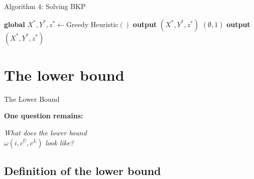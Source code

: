 \documentclass[fleqn,11pt,aspectratio=43]{beamer}
\begin{document}

\begin{frame}[fragile]{Algorithm 4: Solving BKP}
\begin{algorithm}[H]
\caption{Solves BKP}
\begin{algorithmic}[1]
    \State \textbf{global} $X^*, Y^*, z^* \gets \text{Greedy Heuristic}()$
        \State \textbf{output} $(X^*, Y^*, z^*)$
    \EndIf
    \State {}$(\emptyset, 1)$
    \State \textbf{output} $(X^*, Y^*, z^*)$
\end{algorithmic}
\end{algorithm}
\end{frame}

\section{The lower bound}

\begin{frame}[c]{The Lower Bound}
\centering
\vspace{0.5cm}

\Large\textbf{One question remains:}

\vspace{0.8cm}

\LARGE\textit{What does the lower bound} \\
$
\omega(i, c^U, c^L)$
\LARGE\textit{look like?}
\end{frame}



\subsection{Definition of the lower bound}
\end{document}
